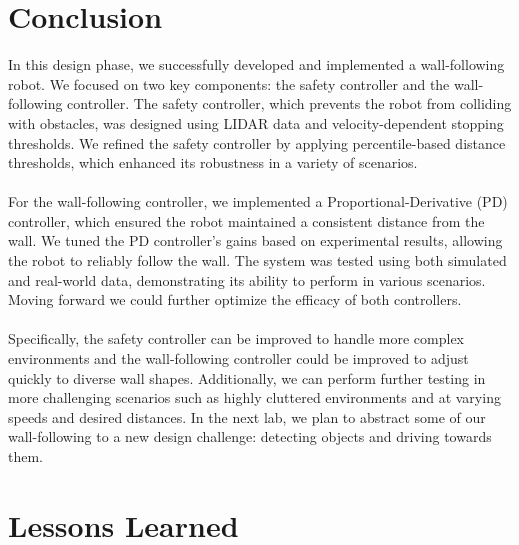 \documentclass{article}
\begin{document}



\section{Conclusion}

In this design phase, we successfully developed and implemented a wall-following robot. We focused on two key components: the safety controller and the wall-following controller. The safety controller, which prevents the robot from colliding with obstacles, was designed using LIDAR data and velocity-dependent stopping thresholds. We refined the safety controller by applying percentile-based distance thresholds, which enhanced its robustness in a variety of scenarios.
\\\\
For the wall-following controller, we implemented a Proportional-Derivative (PD) controller, which ensured the robot maintained a consistent distance from the wall. We tuned the PD controller's gains based on experimental results, allowing the robot to reliably follow the wall. The system was tested using both simulated and real-world data, demonstrating its ability to perform in various scenarios.
Moving forward we could further optimize the efficacy of both controllers. 
\\\\
Specifically, the safety controller can be improved to handle more complex environments and the wall-following controller could be improved to adjust quickly to diverse wall shapes. Additionally, we can perform further testing in more challenging scenarios such as highly cluttered environments and at varying speeds and desired distances. In the next lab, we plan to abstract some of our wall-following to a new design challenge: detecting objects and driving towards them.


\section{Lessons Learned}
\end{document}
